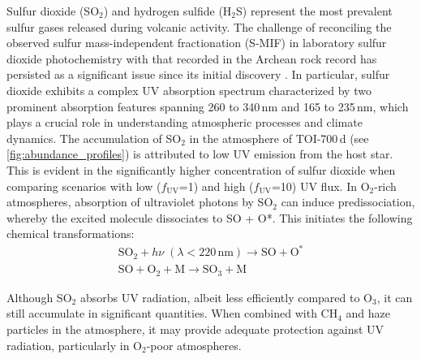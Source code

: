 Sulfur dioxide (SO$_2$) and hydrogen sulfide (H$_2$S) represent the most prevalent sulfur gases released during volcanic activity. The challenge of reconciling the observed sulfur mass-independent fractionation (S-MIF) in laboratory sulfur dioxide photochemistry with that recorded in the Archean rock record has persisted as a significant issue since its initial discovery \citep{Farquhar.et.al.2000Sci...289..756F,Farquhar.et.al.2001JGR...10632829F}. In particular, sulfur dioxide exhibits a complex UV absorption spectrum characterized by two prominent absorption features spanning 260 to 340\,nm and 165 to 235\,nm, which plays a crucial role in understanding atmospheric processes and climate dynamics.
The accumulation of SO$_2$ in the atmosphere of TOI-700\,d (see \autoref{fig:abundance_profiles}) is attributed to low UV emission from the host star. This is evident in the significantly higher concentration of sulfur dioxide when comparing scenarios with low ($f_\mathrm{UV}$=1) and high ($f_\mathrm{UV}$=10) UV flux. 
In O$_2$-rich atmospheres, absorption of ultraviolet photons by SO$_2$ can induce predissociation, whereby the excited molecule dissociates to SO + O*. This initiates the following chemical transformations:
\begin{equation}
    \begin{gathered}
        \text{SO}_2 + h\nu \; (\lambda < 220 \, \textrm{nm}) \xrightarrow\ \text{SO} + \text{O}^* \\
        \text{SO} + \text{O}_2 + \text{M} \xrightarrow\ \text{SO}_3 + \text{M}
    \end{gathered}
\label{eq:SO3}
\end{equation}

Although SO$_2$ absorbs UV radiation, albeit less efficiently compared to O$_3$, it can still accumulate in significant quantities. When combined with CH$_4$ and haze particles in the atmosphere, it may provide adequate protection against UV radiation, particularly in O$_2$-poor atmospheres.

